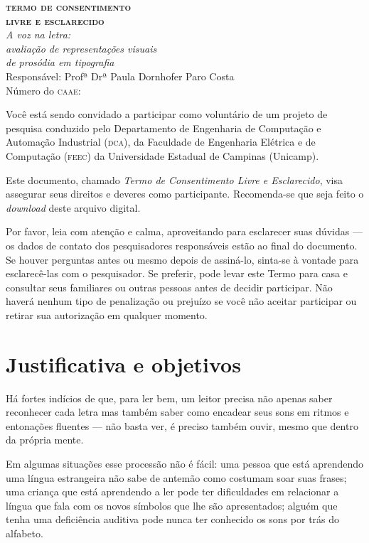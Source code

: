 \documentclass[a4paper,11pt,titlepage,singlespacing]{article}
\begin{document}
	\begin{center}
		\textbf{\Large{\textsc{termo de consentimento \\ livre e esclarecido}}}\\
        \vspace{5pt}
        {\Large\textit{A voz na letra: \\ avaliação de representações visuais \\ de prosódia em tipografia \\ }}
        \vspace{10pt}
        Responsável: Profª Drª Paula Dornhofer Paro Costa\\
        Número do \textsc{caae}: \\
        \vspace{15pt}
	\end{center}

\noindent Você está sendo convidado a participar como voluntário de um projeto de pesquisa conduzido pelo Departamento de Engenharia de Computação e Automação Industrial (\textsc{dca}), da Faculdade de Engenharia Elétrica e de Computação (\textsc{feec}) da Universidade Estadual de Campinas (Unicamp).

Este documento, chamado \textit{Termo de Consentimento Livre e Esclarecido}, visa assegurar seus direitos e deveres como participante. Recomenda-se que seja feito o \textit{download} deste arquivo digital.

Por favor, leia com atenção e calma, aproveitando para esclarecer suas dúvidas — os dados de contato dos pesquisadores responsáveis estão ao final do documento. Se houver perguntas antes ou mesmo depois de assiná-lo, sinta-se à vontade para esclarecê-las com o pesquisador. Se preferir, pode levar este Termo para casa e consultar seus familiares ou outras pessoas antes de decidir participar. Não haverá nenhum tipo de penalização ou prejuízo se você não aceitar participar ou retirar sua autorização em qualquer momento.


\section*{Justificativa e objetivos}

\noindent Há fortes indícios de que, para ler bem, um leitor precisa não apenas saber reconhecer cada letra mas também saber como encadear seus sons em ritmos e entonações fluentes — não basta ver, é preciso também ouvir, mesmo que dentro da própria mente. 

Em algumas situações esse processão não é fácil: uma pessoa que está aprendendo uma língua estrangeira não sabe de antemão como costumam soar suas frases; uma criança que está aprendendo a ler pode ter dificuldades em relacionar a língua que fala com os novos símbolos que lhe são apresentados; alguém que tenha uma deficiência auditiva pode nunca ter conhecido os sons por trás do alfabeto.
\end{document}
